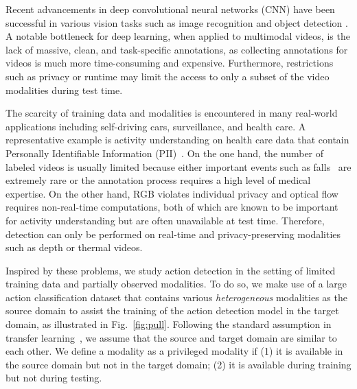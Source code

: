 Recent advancements in deep convolutional neural networks (CNN) have been successful in various vision tasks such as image recognition \cite{imagenet,resnet,alexnet} and object detection \cite{fast_rcnn,yolo,faster_rcnn}. A notable bottleneck for deep learning, when applied to multimodal videos, is the lack of massive, clean, and task-specific annotations, as collecting annotations for videos is much more time-consuming and expensive. Furthermore, restrictions such as privacy or runtime may limit the access to only a subset of the video modalities during test time.

The scarcity of training data and modalities is encountered in many real-world applications including self-driving cars, surveillance, and health care. A representative example is activity understanding on health care data that contain Personally Identifiable Information (PII)~\cite{hand_hygiene,senior_home}. On the one hand, the number of labeled videos is usually limited because either important events such as falls~\cite{fall_detection_principles,fall_detection_survey} are extremely rare or the annotation process requires a high level of medical expertise. On the other hand, RGB violates individual privacy and optical flow requires non-real-time computations, both of which are known to be important for activity understanding but are often unavailable at test time. Therefore, detection can only be performed on real-time and privacy-preserving modalities such as depth or thermal videos.

Inspired by these problems, we study action detection in the setting of limited training data and partially observed modalities. To do so, we make use of a large action classification dataset that contains various \emph{heterogeneous} modalities as the source domain to assist the training of the action detection model in the target domain, as illustrated in Fig.~\ref{fig:pull}. Following the standard assumption in transfer learning~\cite{yosinski2014transferable}, we assume that the source and target domain are similar to each other. We define a modality as a privileged modality if (1) it is available in the source domain but not in the target domain; (2) it is available during training but not during testing. 

